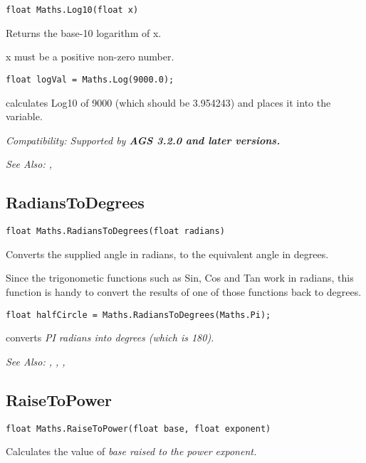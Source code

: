 \begin{verbatim}
float Maths.Log10(float x)
\end{verbatim}
Returns the base-10 logarithm of x.

x must be a positive non-zero number.

\begin{verbatim}
float logVal = Maths.Log(9000.0);
\end{verbatim}
calculates Log10 of 9000 (which should be 3.954243) and places it into the variable.

\it{Compatibility:} Supported by \bf{AGS 3.2.0} and later versions.

\it{See Also:} , 


\subsection{RadiansToDegrees}\label{Maths.RadiansToDegrees}%

\begin{verbatim}
float Maths.RadiansToDegrees(float radians)
\end{verbatim}
Converts the supplied angle in radians, to the equivalent angle in degrees.

Since the trigonometic functions such as Sin, Cos and Tan work in radians, this
function is handy to convert the results of one of those functions back to degrees.

\begin{verbatim}
float halfCircle = Maths.RadiansToDegrees(Maths.Pi);
\end{verbatim}
converts \it{PI} radians into degrees (which is 180).

\it{See Also:} ,
,
, 


\subsection{RaiseToPower}\label{Maths.RaiseToPower}%

\begin{verbatim}
float Maths.RaiseToPower(float base, float exponent)
\end{verbatim}
Calculates the value of \it{base} raised to the power \it{exponent}.

